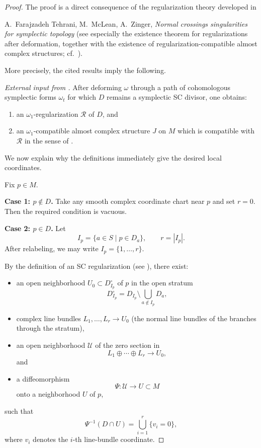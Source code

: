 \documentclass[11pt]{article}
\begin{document}
\begin{proof}
The proof is a direct consequence of the regularization theory developed in

\medskip

\noindent
A.\ Farajzadeh Tehrani, M.\ McLean, A.\ Zinger,
\emph{Normal crossings singularities for symplectic topology}
(see especially the existence theorem for regularizations after deformation,
together with the existence of regularization-compatible almost complex
structures; cf.\ \cite[\S\S3--5]{TMZ}).

\medskip

More precisely, the cited results imply the following.

\smallskip

\emph{External input from \cite{TMZ}.}
After deforming $\omega$ through a path of cohomologous symplectic forms
$\omega_t$ for which $D$ remains a symplectic SC divisor, one obtains:
\begin{enumerate}[label=(\arabic*),itemsep=0.25em]
\item an $\omega_1$-regularization $\mathcal R$ of $D$, and
\item an $\omega_1$-compatible almost complex structure $J$ on $M$
which is compatible with $\mathcal R$ in the sense of \cite[\S3]{TMZ}.
\end{enumerate}

We now explain why the definitions immediately give the desired local
coordinates.

Fix $p\in M$.

\smallskip

\noindent\textbf{Case 1: $p\notin D$.}
Take any smooth complex coordinate chart near $p$ and set $r=0$.
Then the required condition is vacuous.

\smallskip

\noindent\textbf{Case 2: $p\in D$.}
Let
\[
I_p=\{a\in S\mid p\in D_a\},\qquad r=|I_p|.
\]
After relabeling, we may write $I_p=\{1,\dots,r\}$.

By the definition of an SC regularization (see \cite[\S3]{TMZ}), there exist:
\begin{itemize}[itemsep=0.2em]
\item an open neighborhood $U_0\subset D_{I_p}^{\circ}$ of $p$ in the open
stratum
\[
D_{I_p}^{\circ}=D_{I_p}\setminus \bigcup_{a\notin I_p}D_a,
\]
\item complex line bundles $L_1,\dots,L_r\to U_0$ (the normal line bundles of
the branches through the stratum),
\item an open neighborhood $\mathcal U$ of the zero section in
\[
L_1\oplus\cdots\oplus L_r\longrightarrow U_0,
\]
and
\item a diffeomorphism
\[
\Psi\colon \mathcal U \longrightarrow U\subset M
\]
onto a neighborhood $U$ of $p$,
\end{itemize}
such that
\begin{equation}\label{eq:divisor-model}
\Psi^{-1}(D\cap U)=
\bigcup_{i=1}^r\{v_i=0\},
\end{equation}
where $v_i$ denotes the $i$-th line-bundle coordinate.


\end{proof}
\end{document}
